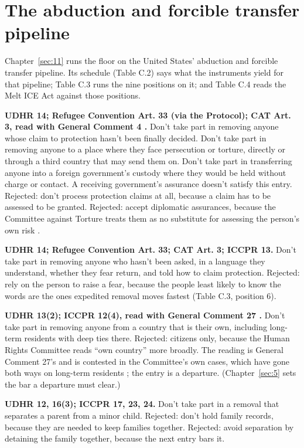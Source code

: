 \section{The abduction and forcible transfer pipeline}
\label{sec:C.3}
Chapter~\ref{sec:11} runs the floor on the United States' abduction and forcible transfer pipeline. Its schedule (Table C.2) says what the instruments yield for that pipeline; Table C.3 runs the nine positions on it; and Table C.4 reads the Melt ICE Act against those positions.


\textbf{UDHR 14; Refugee Convention Art. 33 (via the Protocol); CAT Art. 3, read with General Comment 4 \autocite{cat2017gc4}.} Don't take part in removing anyone whose claim to protection hasn't been finally decided. Don't take part in removing anyone to a place where they face persecution or torture, directly or through a third country that may send them on. Don't take part in transferring anyone into a foreign government's custody where they would be held without charge or contact. A receiving government's assurance doesn't satisfy this entry. Rejected: don't process protection claims at all, because a claim has to be assessed to be granted. Rejected: accept diplomatic assurances, because the Committee against Torture treats them as no substitute for assessing the person's own risk \autocite{cat2017gc4}.

\textbf{UDHR 14; Refugee Convention Art. 33; CAT Art. 3; ICCPR 13.} Don't take part in removing anyone who hasn't been asked, in a language they understand, whether they fear return, and told how to claim protection. Rejected: rely on the person to raise a fear, because the people least likely to know the words are the ones expedited removal moves fastest (Table C.3, position 6).

\textbf{UDHR 13(2); ICCPR 12(4), read with General Comment 27 \autocite{hrc1999gc27}.} Don't take part in removing anyone from a country that is their own, including long-term residents with deep ties there. Rejected: citizens only, because the Human Rights Committee reads “own country” more broadly. The reading is General Comment 27's and is contested in the Committee's own cases, which have gone both ways on long-term residents \autocite{hrc1996stewart,hrc2011nystrom}; the entry is a departure. (Chapter~\ref{sec:5} sets the bar a departure must clear.)

\textbf{UDHR 12, 16(3); ICCPR 17, 23, 24.} Don't take part in a removal that separates a parent from a minor child. Rejected: don't hold family records, because they are needed to keep families together. Rejected: avoid separation by detaining the family together, because the next entry bars it.

